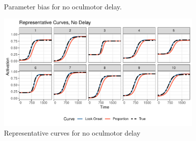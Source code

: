 \documentclass{article}
\begin{document}
\begin{figure}[H]
\centering
\caption{Parameter bias for no oculmotor delay. }
\label{fig:par_bias_no_delay}
\end{figure}

\begin{figure}[H]
\centering
\includegraphics[width=0.9\textwidth]{rep_curves_no_delay.pdf}
\caption{Representative curves for no oculmotor delay}
\label{fig:rep_curves_no_delay}
\end{figure}
\end{document}
